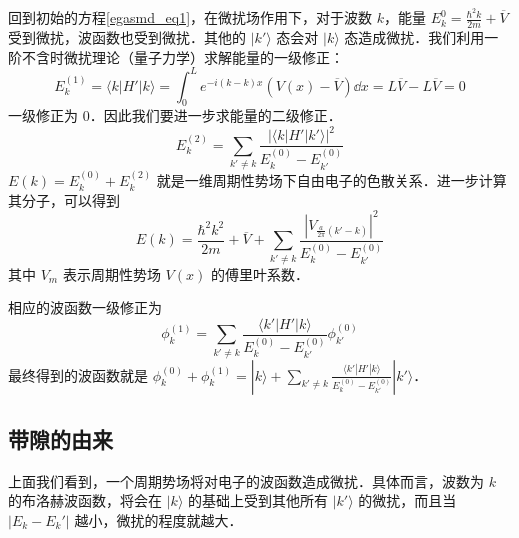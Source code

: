 回到初始的方程\autoref{egasmd_eq1}，在微扰场作用下，对于波数 $k$，能量 $E_k^{0}=\frac{\hbar^2 k}{2m}+\overline V$ 受到微扰，波函数也受到微扰．其他的 $|k'\rangle$ 态会对 $|k\rangle$ 态造成微扰．我们利用一阶不含时微扰理论（量子力学）求解能量的一级修正：
\begin{equation}
E_k^{(1)}=\langle k|H'|k\rangle=\int_0^L e^{-i(k-k)x}(V(x)-\overline V)\dd x=L\overline V-L\overline V=0
\end{equation}
一级修正为 $0$．因此我们要进一步求能量的二级修正．
\begin{equation}
E_k^{(2)}=\sum_{k'\neq k}\frac{|\langle k|H'|k'\rangle|^2}{E_k^{(0)}-E_{k'}^{(0)}}
\end{equation}
$E(k)=E_k^{(0)}+E_k^{(2)}$ 就是一维周期性势场下自由电子的色散关系．进一步计算其分子，可以得到
\begin{equation}
E(k)=\frac{\hbar^2 k^2}{2m}+\overline V+\sum_{k'\neq k} \frac{|V_{\frac{a}{2\pi}(k'-k)}|^2}{E_k^{(0)}-E_{k'}^{(0)}}
\end{equation}
其中 $V_m$ 表示周期性势场 $V(x)$ 的傅里叶系数．

相应的波函数一级修正为
\begin{equation}
\phi_k^{(1)}=\sum_{k'\neq k}\frac{\langle k'|H'|k\rangle}{E_k^{(0)}-E_{k'}^{(0)}} \phi_{k'}^{(0)}
\end{equation}
最终得到的波函数就是 $\phi_k^{(0)}+\phi_k^{(1)}=|k\rangle+\sum_{k'\neq k}\frac{\langle k'|H'|k\rangle}{E_k^{(0)}-E_{k'}^{(0)}} |k'\rangle$．
\subsection{带隙的由来}
上面我们看到，一个周期势场将对电子的波函数造成微扰．具体而言，波数为 $k$ 的布洛赫波函数，将会在 $|k\rangle$ 的基础上受到其他所有 $|k'\rangle$ 的微扰，而且当 $|E_k-E_k'|$ 越小，微扰的程度就越大．

